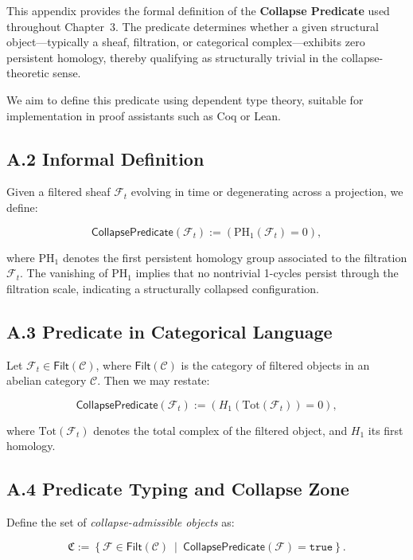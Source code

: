\documentclass[11pt]{article}
\begin{document}
This appendix provides the formal definition of the \textbf{Collapse Predicate} used throughout Chapter~3. The predicate determines whether a given structural object—typically a sheaf, filtration, or categorical complex—exhibits zero persistent homology, thereby qualifying as structurally trivial in the collapse-theoretic sense.

We aim to define this predicate using dependent type theory, suitable for implementation in proof assistants such as Coq or Lean.

\subsection*{A.2 Informal Definition}

Given a filtered sheaf \( \mathcal{F}_t \) evolving in time or degenerating across a projection, we define:

\[
\mathsf{CollapsePredicate}(\mathcal{F}_t) := \left( \mathrm{PH}_1(\mathcal{F}_t) = 0 \right),
\]

where \( \mathrm{PH}_1 \) denotes the first persistent homology group associated to the filtration \( \mathcal{F}_t \). The vanishing of \( \mathrm{PH}_1 \) implies that no nontrivial 1-cycles persist through the filtration scale, indicating a structurally collapsed configuration.

\subsection*{A.3 Predicate in Categorical Language}

Let \( \mathcal{F}_t \in \mathsf{Filt}(\mathcal{C}) \), where \( \mathsf{Filt}(\mathcal{C}) \) is the category of filtered objects in an abelian category \( \mathcal{C} \). Then we may restate:

\[
\mathsf{CollapsePredicate}(\mathcal{F}_t) := \left( H_1(\mathrm{Tot}(\mathcal{F}_t)) = 0 \right),
\]

where \( \mathrm{Tot}(\mathcal{F}_t) \) denotes the total complex of the filtered object, and \( H_1 \) its first homology.

\subsection*{A.4 Predicate Typing and Collapse Zone}

Define the set of \emph{collapse-admissible objects} as:

\[
\mathfrak{C} := \left\{ \mathcal{F} \in \mathsf{Filt}(\mathcal{C}) \ \middle| \ \mathsf{CollapsePredicate}(\mathcal{F}) = \texttt{true} \right\}.
\]
\end{document}
